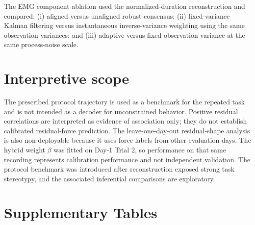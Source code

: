 \documentclass[preprint,12pt]{elsarticle}
\begin{document}
The EMG component ablation used the normalized-duration reconstruction and compared: (i) aligned versus unaligned robust consensus; (ii) fixed-variance Kalman filtering versus instantaneous inverse-variance weighting using the same observation variances; and (iii) adaptive versus fixed observation variance at the same process-noise scale.

\section*{Interpretive scope}

The prescribed protocol trajectory is used as a benchmark for the repeated task and is not intended as a decoder for unconstrained behavior. Positive residual correlations are interpreted as evidence of association only; they do not establish calibrated residual-force prediction. The leave-one-day-out residual-shape analysis is also non-deployable because it uses force labels from other evaluation days. The hybrid weight $\beta$ was fitted on Day-1 Trial 2, so performance on that same recording represents calibration performance and not independent validation. The protocol benchmark was introduced after reconstruction exposed strong task stereotypy, and the associated inferential comparisons are exploratory.

\clearpage
\section*{Supplementary Tables}
\end{document}
